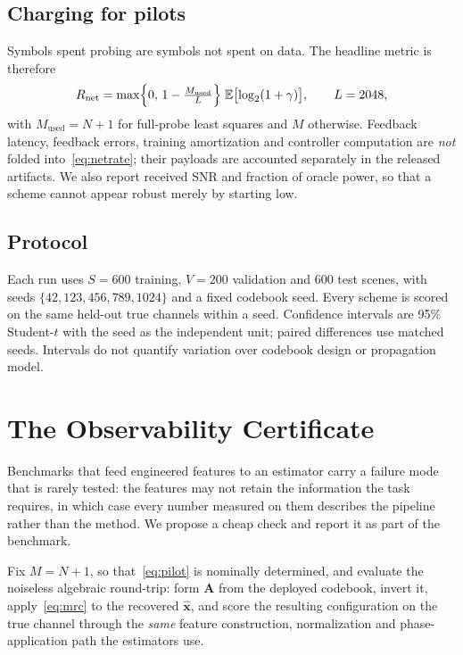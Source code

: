 \documentclass[journal]{IEEEtran}
\begin{document}
\subsection{Charging for pilots}
Symbols spent probing are symbols not spent on data. The headline metric is therefore
\begin{equation}
R_{\mathrm{net}} = \max\Bigl\{0,\,1-\tfrac{M_{\mathrm{used}}}{L}\Bigr\}\;\mathbb{E}\bigl[\log_2(1+\gamma)\bigr],
\qquad L=2048,
\label{eq:netrate}
\end{equation}
with $M_{\mathrm{used}}=N+1$ for full-probe least squares and $M$ otherwise. Feedback latency, feedback errors, training amortization and controller computation are \emph{not} folded into~\eqref{eq:netrate}; their payloads are accounted separately in the released artifacts. We also report received SNR and fraction of oracle power, so that a scheme cannot appear robust merely by starting low.

\subsection{Protocol}
Each run uses $S=600$ training, $V=200$ validation and 600 test scenes, with seeds $\{42,123,456,789,1024\}$ and a fixed codebook seed. Every scheme is scored on the same held-out true channels within a seed. Confidence intervals are 95\% Student-$t$ with the seed as the independent unit; paired differences use matched seeds. Intervals do not quantify variation over codebook design or propagation model.

\section{The Observability Certificate}
\label{sec:cert}

Benchmarks that feed engineered features to an estimator carry a failure mode that is rarely tested: the features may not retain the information the task requires, in which case every number measured on them describes the pipeline rather than the method. We propose a cheap check and report it as part of the benchmark.

Fix $M=N+1$, so that~\eqref{eq:pilot} is nominally determined, and evaluate the noiseless algebraic round-trip: form $\bm{A}$ from the deployed codebook, invert it, apply~\eqref{eq:mrc} to the recovered $\hat{\bm{x}}$, and score the resulting configuration on the true channel through the \emph{same} feature construction, normalization and phase-application path the estimators use.
\end{document}
